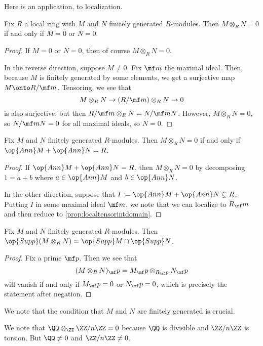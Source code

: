 Here is an application, to localization.
\begin{proposition} \label{prop:localtensorintdomain}
	Fix $R$ a local ring with $M$ and $N$ finitely generated $R$-modules. Then $M\otimes_RN=0$ if and only if $M=0$ or $N=0$.
\end{proposition}
\begin{proof}
	If $M=0$ or $N=0$, then of course $M\otimes_RN=0$.
	
	In the reverse direction, suppose $M\ne0$. Fix $\mf m$ the maximal ideal. Then, because $M$ is finitely generated by some elements, we get a surjective map $M\onto R/\mf m$. Tensoring, we see that
	\[M\otimes_RN\to(R/\mf m)\otimes_RN\to0\]
	is also surjective, but then $R/\mf m\otimes_RN=N/\mf mN$. However, $M\otimes_RN=0$, so $N/\mf mN=0$ for all maximal ideals, so $N=0$.
\end{proof}
\begin{corollary}
	Fix $M$ and $N$ finitely generated $R$-modules. Then $M\otimes_RN=0$ if and only if $\op{Ann}M+\op{Ann}N=R$.
\end{corollary}
\begin{proof}
	If $\op{Ann}M+\op{Ann}N=R$, then $M\otimes_RN=0$ by decomposing $1=a+b$ where $a\in\op{Ann}M$ and $b\in\op{Ann}N$.

	In the other direction, suppose that $I:=\op{Ann}M+\op{Ann}N\subsetneq R$. Putting $I$ in some maximal ideal $\mf m$, we note that we can localize to $R_\mf m$ and then reduce to \autoref{prop:localtensorintdomain}.
\end{proof}
\begin{corollary}
	Fix $M$ and $N$ finitely generated $R$-modules. Then $\op{Supp}(M\otimes_RN)=\op{Supp}M\cap\op{Supp}N$.
\end{corollary}
\begin{proof}
	Fix a prime $\mf p$. Then we see that
	\[(M\otimes_RN)_\mf p=M_\mf p\otimes_{R_\mf p}N_\mf p\]
	will vanish if and only if $M_\mf p=0$ or $N_\mf p=0$, which is precisely the statement after negation.
\end{proof}
We note that the condition that $M$ and $N$ are finitely generated is crucial.
\begin{nex}
	We note that $\QQ\otimes_\ZZ\ZZ/n\ZZ=0$ because $\QQ$ is divisible and $\ZZ/n\ZZ$ is torsion. But $\QQ\ne0$ and $\ZZ/n\ZZ\ne0$.
\end{nex}

